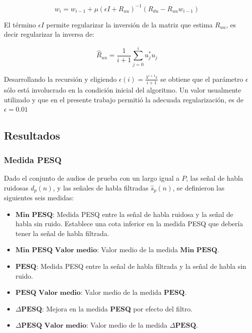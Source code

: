 \begin{equation}
	w_i = w_{i-1} + \mu (\epsilon I + R_{uu} )^{-1} \left( R_{du} - R_{uu} w_{i-1} \right)
\end{equation}

El término $\epsilon I$ permite regularizar la inversión de la matriz que estima $R_{uu}$, es decir regularizar la inversa de:

\begin{equation*}
	\hat{R}_{uu} = \frac{1}{i+1} \sum_{j=0}^{i} u_j^* u_j
\end{equation*}

Desarrollando la recursión y eligiendo $\epsilon(i) = \frac{\lambda^{i+1} \epsilon }{i+1}$ se obtiene que el parámetro $\epsilon$ sólo está involucrado en la condición inicial del algoritmo. Un valor usualmente utilizado y que en el presente trabajo permitió la adecuada regularización, es de $\epsilon=0.01$


\subsection{Resultados}

\subsubsection{Medida PESQ}

Dado el conjunto de audios de prueba con un largo igual a $P$, las señal de habla ruidosas $d_p(n)$, y las señales de habla filtradas $\hat{s}_p(n)$, se definieron las siguientes seis medidas:

\begin{itemize}
	\item $\textbf{Min PESQ}$: Medida PESQ entre la señal de habla ruidosa y la señal de habla sin ruido. Establece una cota inferior en la medida PESQ que debería tener la señal de habla filtrada.
	\item $\textbf{Min PESQ Valor medio}$: Valor medio de la medida $\textbf{Min PESQ}$.
	\item $\textbf{PESQ}$: Medida PESQ entre la señal de habla filtrada y la señal de habla sin ruido.
	\item $\textbf{PESQ Valor medio}$: Valor medio de la medida $\textbf{PESQ}$.
	\item $\Delta \textbf{PESQ}$: Mejora en la medida \textbf{PESQ} por efecto del filtro.
	\item $\Delta \textbf{PESQ Valor medio}$: Valor medio de la medida $\Delta \textbf{PESQ}$.
\end{itemize}


